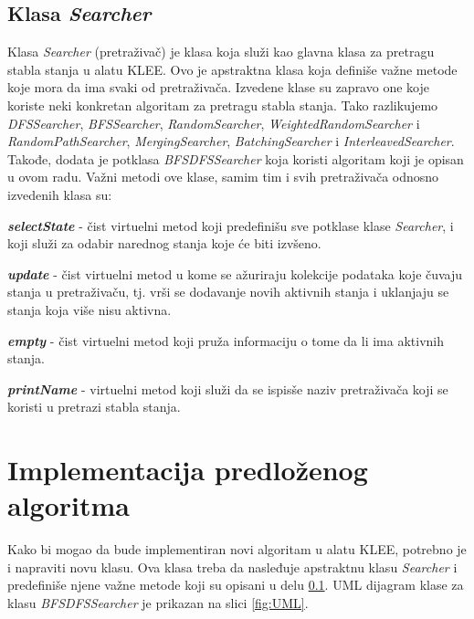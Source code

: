 \documentclass[12pt,oneside]{memoir}
\begin{document}
\subsection{Klasa \textit{Searcher}} \label{pretrazivac}
Klasa \textit{Searcher} (pretraživač) je klasa koja služi kao glavna klasa za pretragu stabla stanja u alatu KLEE. Ovo je apstraktna klasa koja definiše važne metode koje mora da ima svaki od pretraživača. Izvedene klase su zapravo one koje koriste neki konkretan algoritam za pretragu stabla stanja. Tako razlikujemo \textit{DFSSearcher}, \textit{BFSSearcher}, \textit{RandomSearcher}, \textit{WeightedRandomSearcher} i \textit{RandomPathSearcher}, \textit{MergingSearcher}, \textit{BatchingSearcher} i \textit{InterleavedSearcher}. Takođe, dodata je potklasa \textit{BFSDFSSearcher} koja koristi algoritam koji je opisan u ovom radu. Važni metodi ove klase, samim tim i svih pretraživača odnosno izvedenih klasa su:
\begin{description}
    \item \textbf{\textit{selectState}} - čist virtuelni metod koji predefinišu sve potklase klase \textit{Searcher}, i koji služi za odabir narednog stanja koje će biti izvšeno.
    
    \item \textbf{\textit{update}} - čist virtuelni metod u kome se ažuriraju kolekcije podataka koje čuvaju stanja u pretraživaču, tj. vrši se dodavanje novih aktivnih stanja i uklanjaju se stanja koja više nisu aktivna. 
    
    \item \textbf{\textit{empty}} - čist virtuelni metod koji pruža informaciju o tome da li ima aktivnih stanja.
    
    \item \textbf{\textit{printName}} - virtuelni metod koji služi da se ispisše naziv pretraživača koji se koristi u pretrazi stabla stanja.
\end{description}

\section{Implementacija predloženog algoritma}
Kako bi mogao da bude implementiran novi algoritam u alatu KLEE, potrebno je i napraviti novu klasu. Ova klasa treba da nasleđuje apstraktnu klasu \textit{Searcher} i predefiniše njene važne metode koji su opisani u delu \ref{pretrazivac}. UML dijagram klase za klasu \textit{BFSDFSSearcher} je prikazan na slici \ref{fig:UML}.
\end{document}

